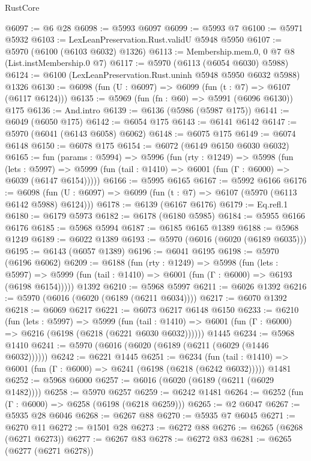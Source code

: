 \begin{lexlean}{RustCore}
\begin{coremodule}
{\begin{coremodule}
{{{{{{{{{{{{{{{{{{{{{{{{{{{{{{{{{{{{{{{{{{{{{@6097 := @6 @28
@6098 := @5993 @6097
@6099 := @5993 @7
@6100 := @5971 @5932
@6103 := LexLeanPreservation.Rust.validU @5948 @5950
@6107 := @5970 (@6100 (@6103 @6032) @1326)
@6113 := Membership.mem.{0, 0} @7 @8 (List.instMembership.{0} @7)
@6117 := @5970 (@6113 (@6054 @6030) @5988)
@6124 := @6100 (LexLeanPreservation.Rust.uninh @5948 @5950 @6032 @5988) @1326
@6130 := @6098 (fun (U : @6097) => @6099 (fun (t : @7) => @6107 (@6117 @6124)))
@6135 := @5969 (fun (fn : @60) => @5991 (@6096 @6130)) @175
@6136 := And.intro
@6139 := @6136 (@5986 (@5987 @175))
@6141 := @6049 (@6050 @175)
@6142 := @6054 @175
@6143 := @6141 @6142
@6147 := @5970 (@6041 (@6143 @6058) @6062)
@6148 := @6075 @175
@6149 := @6074 @6148
@6150 := @6078 @175
@6154 := @6072 (@6149 @6150 @6030 @6032)
@6165 := fun (params : @5994) =>
  @5996
    (fun (rty : @1249) =>
    @5998
      (fun (lets : @5997) =>
      @5999 (fun (tail : @1410) => @6001 (fun (Γ : @6000) => @6039 (@6147 @6154)))))
@6166 := @5995 @6165
@6167 := @5992 @6166
@6176 := @6098 (fun (U : @6097) => @6099 (fun (t : @7) => @6107 (@5970 (@6113 @6142 @5988) @6124)))
@6178 := @6139 (@6167 @6176)
@6179 := Eq.refl.{1}
@6180 := @6179 @5973
@6182 := @6178 (@6180 @5985)
@6184 := @5955 @6166 @6176
@6185 := @5968 @5994
@6187 := @6185 @6165 @1389
@6188 := @5968 @1249
@6189 := @6022 @1389
@6193 := @5970 (@6016 (@6020 (@6189 @6035)))
@6195 := @6143 (@6057 @1389)
@6196 := @6041 @6195
@6198 := @5970 (@6196 @6062)
@6209 := @6188
    (fun (rty : @1249) =>
    @5998
      (fun (lets : @5997) =>
      @5999 (fun (tail : @1410) => @6001 (fun (Γ : @6000) => @6193 (@6198 @6154)))))
    @1392
@6210 := @5968 @5997
@6211 := @6026 @1392
@6216 := @5970 (@6016 (@6020 (@6189 (@6211 @6034))))
@6217 := @6070 @1392
@6218 := @6069 @6217
@6221 := @6073 @6217 @6148 @6150
@6233 := @6210
    (fun (lets : @5997) =>
    @5999
      (fun (tail : @1410) => @6001 (fun (Γ : @6000) => @6216 (@6198 (@6218 (@6221 @6030 @6032))))))
    @1445
@6234 := @5968 @1410
@6241 := @5970 (@6016 (@6020 (@6189 (@6211 (@6029 (@1446 @6032))))))
@6242 := @6221 @1445
@6251 := @6234
    (fun (tail : @1410) => @6001 (fun (Γ : @6000) => @6241 (@6198 (@6218 (@6242 @6032)))))
    @1481
@6252 := @5968 @6000
@6257 := @6016 (@6020 (@6189 (@6211 (@6029 @1482))))
@6258 := @5970 @6257
@6259 := @6242 @1481
@6264 := @6252 (fun (Γ : @6000) => @6258 (@6198 (@6218 @6259)))
@6265 := @2 @6047
@6267 := @5935 @28 @6046
@6268 := @6267 @88
@6270 := @5935 @7 @6045
@6271 := @6270 @11
@6272 := @1501 @28
@6273 := @6272 @88
@6276 := @6265 (@6268 (@6271 @6273))
@6277 := @6267 @83
@6278 := @6272 @83
@6281 := @6265 (@6277 (@6271 @6278))
}}}}}}}}}}}}}}}}}}}}}}}}}}}}}}}}}}}}}}}}}}}}}
\end{coremodule}}
\end{coremodule}
\end{lexlean}
